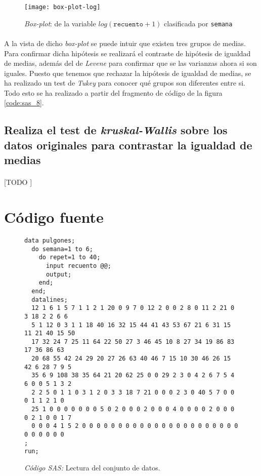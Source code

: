 \documentclass[11pt]{article}
\begin{document}
      \begin{figure}
        \centering
        \texttt{[image: box-plot-log]}
        \caption{\emph{Box-plot}: de la variable $log(\texttt{recuento} + 1)$ clasificada por \texttt{semana}}
        \label{img:box-plot-log}
      \end{figure}

      \paragraph{}
      A la vista de dicho \emph{box-plot} se puede intuir que existen tres grupos de medias. Para confirmar dicha hipótesis se realizará el contraste de hipótesis de igualdad de medias, además del de \emph{Levene} para confirmar que se las varianzas ahora si son iguales. Puesto que tenemos que rechazar la hipótesis de igualdad de medias, se ha realizado un test de \emph{Tukey} para conocer qué grupos son diferentes entre si. Todo esto se ha realizado a partir del fragmento de código de la figura \ref{code:sas_8}.

    \subsection{Realiza el test de \emph{kruskal-Wallis} sobre los datos originales para contrastar la igualdad de medias}
    \label{sec:e5}
      \paragraph{}
      [TODO ]

  \section{Código fuente}
  \label{sec:code}

    \begin{figure}[!h]
      \centering
      \begin{verbatim}
data pulgones;
  do semana=1 to 6;
    do repet=1 to 40;
      input recuento @@;
      output;
    end;
  end;
  datalines;
  12 1 6 1 5 7 1 1 2 1 20 0 9 7 0 12 2 0 0 2 8 0 11 2 21 0 3 18 2 2 6 6
  5 1 12 0 3 1 1 18 40 16 32 15 44 41 43 53 67 21 6 31 15 11 21 40 15 50
  17 32 24 7 25 11 64 22 50 27 3 46 45 10 8 27 34 19 86 83 17 36 86 63
  20 68 55 42 24 29 20 27 26 63 40 46 7 15 10 30 46 26 15 42 6 28 7 9 5
  35 6 9 108 38 35 64 21 20 62 25 0 0 29 2 3 0 4 2 6 7 5 4 6 0 0 5 1 3 2
  2 2 5 0 1 1 0 3 1 2 0 3 3 18 7 21 0 0 0 2 3 0 40 5 7 0 0 0 1 1 2 1 0
  25 1 0 0 0 0 0 0 0 5 0 2 0 0 0 2 0 0 0 4 0 0 0 0 2 0 0 0 0 2 1 0 0 1 7
  0 0 0 4 1 5 2 0 0 0 0 0 0 0 0 0 0 0 0 0 0 0 0 0 0 0 0 0 0 0 0 0 0 0 0
;
run;
      \end{verbatim}
      \caption{\emph{Código SAS:} Lectura del conjunto de datos.}
      \label{code:sas_1}
    \end{figure}
\end{document}
